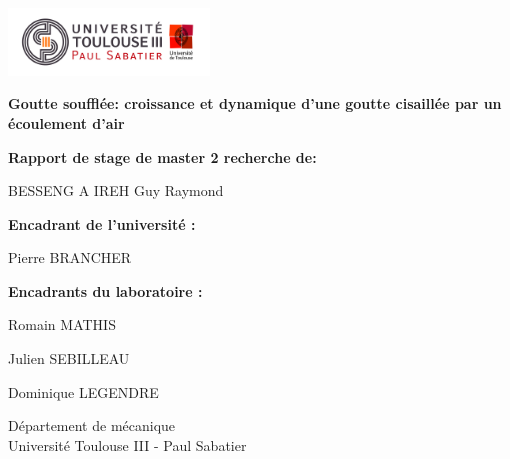 \begin{titlepage}
  \includegraphics[width=0.4\textwidth]{Logo_UT3.jpg}
    \begin{center}

      \LARGE
        \textbf{Goutte soufflée: croissance et dynamique d'une goutte cisaillée par un écoulement d'air}


        \vspace{1.5cm}
        \textbf{Rapport de stage de master 2 recherche de:}
        
        BESSENG A IREH Guy Raymond

        \vspace{0.8cm}
        \textbf{Encadrant de l'université :}

        Pierre BRANCHER

        \vspace{0.8cm}
        \textbf{Encadrants du laboratoire :}

        Romain MATHIS

        Julien SEBILLEAU

        Dominique LEGENDRE

        \vfill
        
        \Large
        Département de mécanique\\
        Université Toulouse III - Paul Sabatier\\
        \date{}

    \end{center}
\end{titlepage}
